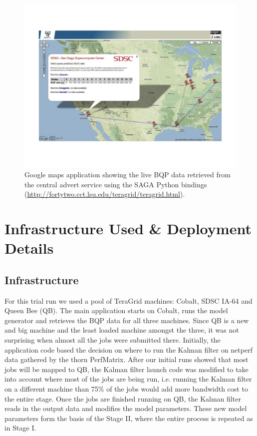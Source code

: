 \documentclass[conference,final]{IEEEtran}
\begin{document}
\begin{figure}
\begin{center}
\includegraphics*[scale=0.34, trim=15mm 33mm 15mm 33mm]{./figures/gmaps_bqp}
\end{center}
\caption{Google maps application showing the live BQP data retrieved
  from the central advert service using the SAGA Python bindings
  (\url{http://fortytwo.cct.lsu.edu/teragrid/teragrid.html}).}
\label{fig:gmaps_bqp}
\end{figure}

\section{Infrastructure Used \& Deployment Details}

\subsection{Infrastructure}
For this trial run we used a pool of TeraGrid machines: Cobalt, SDSC
IA-64 and Queen Bee (QB). The main application starts on Cobalt, runs
the model generator and retrieves the BQP data for all three machines.
Since QB is a new and big machine and the least loaded machine amongst
the three, it was not surprising when almost all the jobs were
submitted there.  Initially, the application code based the decision
on where to run the Kalman filter on netperf data gathered by the
thorn PerfMatrix. After our initial runs showed that most jobs will be
mapped to QB, the Kalman filter launch code was modified to take into
account where most of the jobs are being run, i.e. running the Kalman
filter on a different machine than 75\% of the jobs would add more
bandwidth cost to the entire stage. Once the jobs are finished running
on QB, the Kalman filter reads in the output data and modifies the
model parameters. These new model parameters form the basis of the
Stage II, where the entire process is repeated as in Stage I.
\end{document}
